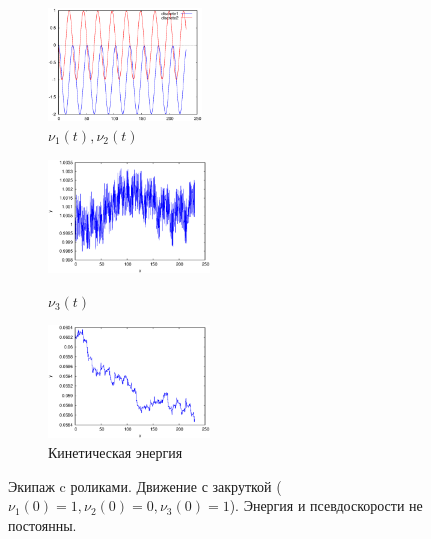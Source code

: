 \begin{figure}
    \begin{subfigure}[t]{0.3\textwidth}
        \centering
        \includegraphics[width=\linewidth, height=30mm]{pic/_sol__1_0_1__0__230__1e2_nu12_centered}
        \caption{$\nu_1(t), \nu_2(t)$}
        \label{fig:_sol__1_0_1__0__230__1e2_nu12_centered}    
    \end{subfigure}
    \hfill
    \begin{subfigure}[t]{0.3\textwidth}
        \centering
        \includegraphics[width=\linewidth, height=30mm]{pic/_sol__1_0_1__0__230__1e2_nu3} \\
        \caption{$\nu_3(t)$}
        \label{fig:_sol__1_0_1__0__230__1e2_nu3}
    \end{subfigure}
    \hfill
    \begin{subfigure}[t]{0.3\textwidth}
        \centering
        \includegraphics[width=\linewidth, height=30mm]{pic/_sol__1_0_1__0__230__1e2_kin_en}
        \caption{Кинетическая энергия}
        \label{fig:_sol__1_0_1__0__230__1e2_kin_en}
    \end{subfigure}
    
    \caption{Экипаж c роликами. Движение с закруткой ($\nu_1(0) = 1, \nu_2(0) = 0, \nu_3(0) = 1$). Энергия и псевдоскорости не постоянны.}
    \label{fig:wrench}
\end{figure}
